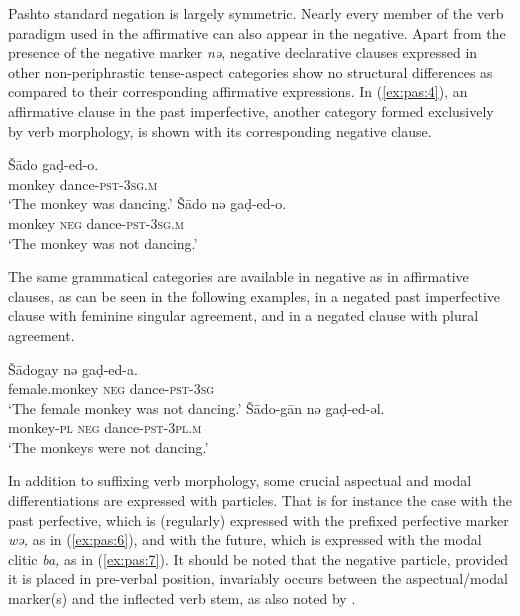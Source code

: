 \documentclass[output=paper,colorlinks,citecolor=brown]{langscibook}
\begin{document}
Pashto standard negation is largely symmetric. Nearly every member of the verb paradigm used in the affirmative can also appear in the negative. Apart from the presence of the negative marker \textit{nə}, negative declarative clauses expressed in other non-periphrastic tense-aspect categories show no structural differences as compared to their corresponding affirmative expressions. In (\ref{ex:pas:4}), an affirmative clause in the past imperfective, another category formed exclusively by verb morphology, is shown with its corresponding negative clause. 

\ea\label{ex:pas:4}
    \ea\label{ex:pas:4a}
        \gll Š\={a}do gaḍ{}-ed{}-o.\\
            monkey dance{}-\textsc{pst-3sg.m}  \\
        \glt ‘The monkey was dancing.’
    \ex\label{ex:pas:4b}
        \gll Š\={a}do nə gaḍ-ed{}-o. \\
            monkey \textsc{neg} dance{}-\textsc{pst-3sg.m} \\
        \glt ‘The monkey was not dancing.’
    \z
\z 

The same grammatical categories are available in negative as in affirmative clauses, as can be seen in the following examples, in  a negated past imperfective clause with feminine singular agreement, and in  a negated clause with plural agreement. 

\ea\label{ex:pas:5}
    \ea\label{ex:pas:5a}
        \gll Š\={a}dogay nə gaḍ{}-ed-a.\\
             female.monkey \textsc{neg} dance-\textsc{pst-3sg} \\
        \glt ‘The female monkey was not dancing.’
    \ex\label{ex:pas:5b}
        \gll Š\={a}do{}-gān nə gaḍ-ed{}-əl. \\
            monkey{}-\textsc{pl} \textsc{neg} dance-\textsc{pst-3pl.m} \\
        \glt ‘The monkeys were not dancing.’
    \z
\z 

In addition to suffixing verb morphology, some crucial aspectual and modal differentiations are expressed with particles. That is for instance the case with the past perfective, which is (regularly) expressed with the prefixed perfective marker \textit{wə,} as in (\ref{ex:pas:6}), and with the future, which is expressed with the modal clitic \textit{ba,} as in (\ref{ex:pas:7}). It should be noted that the negative particle, provided it is placed in pre-verbal position, invariably occurs between the aspectual/modal marker(s) and the inflected verb stem, as also noted by \citet[408]{BrugmanDavid2014}. 
\end{document}
